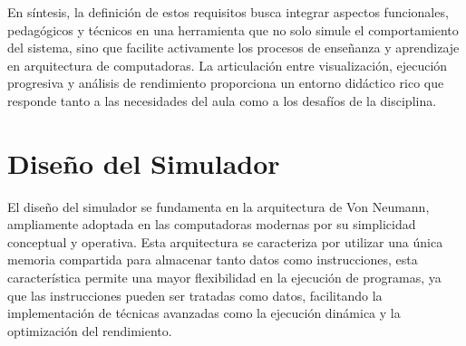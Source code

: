\documentclass[12pt,oneside]{templates/unerthesis}
\begin{document}
\begin{table}[!h]
\centering
\caption{\label{tab:requisitosdidacticos}Requisitos didácticos y beneficios pedagógicos esperados}
\centering
{}
\end{table}

En síntesis, la definición de estos requisitos busca integrar aspectos funcionales, pedagógicos y técnicos en una herramienta que no solo simule el comportamiento del sistema, sino que facilite activamente los procesos de enseñanza y aprendizaje en arquitectura de computadoras. La articulación entre visualización, ejecución progresiva y análisis de rendimiento proporciona un entorno didáctico rico que responde tanto a las necesidades del aula como a los desafíos de la disciplina.

\hypertarget{diseuxf1o-del-simulador}{%
\section{Diseño del Simulador}\label{diseuxf1o-del-simulador}}

El diseño del simulador se fundamenta en la arquitectura de Von Neumann, ampliamente adoptada en las computadoras modernas por su simplicidad conceptual y operativa. Esta arquitectura se caracteriza por utilizar una única memoria compartida para almacenar tanto datos como instrucciones, esta característica permite una mayor flexibilidad en la ejecución de programas, ya que las instrucciones pueden ser tratadas como datos, facilitando la implementación de técnicas avanzadas como la ejecución dinámica y la optimización del rendimiento.
\end{document}
